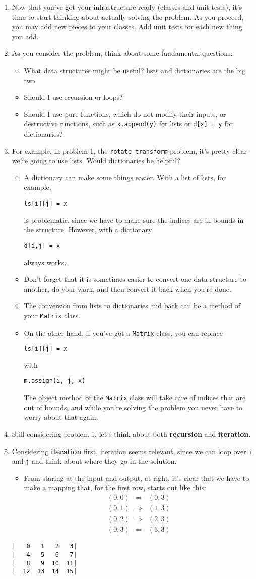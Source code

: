 \documentclass[12pt]{article}
\newcommand{\bi}{\begin{itemize}}
\newcommand{\li}{\item}
\newcommand{\ei}{\end{itemize}}
\begin{document}
\begin{enumerate}
\li Now that you've got your infrastructure ready (classes and unit tests), it's time to
start thinking about actually solving the problem.  As you proceed, you may add
new pieces to your classes.  Add unit tests for each new thing you add.

\li As you consider the problem, think about some fundamental questions:
\bi
\li What data structures might be useful?  lists and dictionaries are the big two.
\li Should I use recursion or loops?
\li Should I use pure functions, which do not modify their inputs, or
destructive functions, such as \lstinline{x.append(y)} for lists or \lstinline{d[x] = y}
for dictionaries?
\ei
\li For example, in problem 1, the \lstinline{rotate_transform} problem, it's pretty clear
we're going to use lists.  Would dictionaries be helpful?
\bi
\li A dictionary can make some
things easier.  With a list of lists, for example,
\begin{lstlisting}
ls[i][j] = x
\end{lstlisting}
 is problematic,
since we have to make sure the indices are in bounds in the structure.  However,
with a dictionary
\begin{lstlisting}
d[i,j] = x
\end{lstlisting}
 always works.
\li Don't forget that it is sometimes easier to convert one data structure to another,
do your work, and then convert it back when you're done.
\li The conversion from lists to dictionaries and back can be a method of your
\lstinline{Matrix} class.
\li On the other hand, if you've got a \lstinline{Matrix} class, you can replace
\begin{lstlisting}
ls[i][j] = x
\end{lstlisting}
with
\begin{lstlisting}
m.assign(i, j, x)
\end{lstlisting}
The object method of the \lstinline{Matrix} class
 will take care of indices that are out of bounds, and
while you're solving the problem you never have to worry about that again.
\ei
\li Still considering problem 1, let's think about both {\bf recursion} and {\bf iteration}.
\li Considering {\bf iteration} first, iteration seems relevant, since
we can loop over \lstinline{i} and \lstinline{j}
and think about where they go in the solution.
\begin{multicols}{2}
\bi
\li From staring at the input and output, at right, it's clear
that we have to make a mapping that, for the first row,
 starts out like this:
\[
\begin{array}{rcl}
(0,0) &\Rightarrow& (0,3)\\
(0,1) &\Rightarrow& (1,3)\\
(0,2) &\Rightarrow& (2,3)\\
(0,3) &\Rightarrow& (3,3)\end{array}
\]
\ei
\columnbreak
\begin{Verbatim}[frame=single,label=iteration]
|   0   1   2   3|
|   4   5   6   7|
|   8   9  10  11|
|  12  13  14  15|


\end{Verbatim}
\end{multicols}
\end{enumerate}
\end{document}
